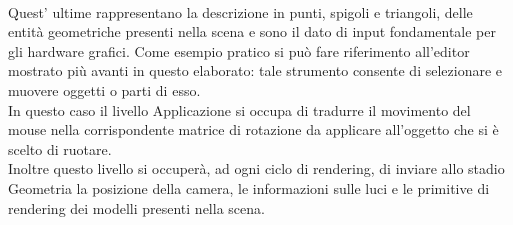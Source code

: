 \\
Quest’ ultime rappresentano la descrizione in punti, spigoli e triangoli, delle entità geometriche presenti nella scena e sono il dato di input fondamentale per gli hardware grafici. 
Come esempio pratico si può fare riferimento all’editor mostrato più avanti in questo elaborato: tale strumento consente di selezionare e muovere oggetti o parti di esso.
\\
In questo caso il livello Applicazione si occupa di tradurre il movimento del mouse nella corrispondente matrice di rotazione da applicare all’oggetto che si è scelto di ruotare.
\\
Inoltre questo livello si occuperà, ad ogni ciclo di rendering, di inviare allo stadio Geometria la posizione della camera, le informazioni sulle luci e le primitive di rendering dei modelli presenti nella scena.


